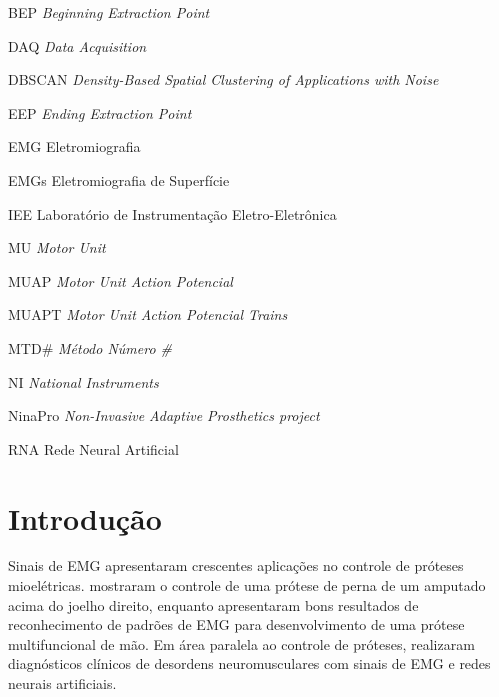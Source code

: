 
\listoffigures*
\cleardoublepage

\listoftables*
\cleardoublepage

\begin{siglas}
	\item[BEP]		\emph{Beginning Extraction Point}
	\item[DAQ]		\emph{Data Acquisition}
	\item[DBSCAN]	\emph{Density-Based Spatial Clustering of Applications with Noise}
	\item[EEP]		\emph{Ending Extraction Point}
  	\item[EMG]		Eletromiografia
	\item[EMGs]		Eletromiografia de Superfície
	\item[IEE]		Laboratório de Instrumentação Eletro-Eletrônica
	\item[MU]		\emph{Motor Unit}
  	\item[MUAP]		\emph{Motor Unit Action Potencial}
	\item[MUAPT]	\emph{Motor Unit Action Potencial Trains}
	\item[MTD\#]	\emph{Método Número \#}
	\item[NI]		\emph{National Instruments}
	\item[NinaPro]	\emph{Non-Invasive Adaptive Prosthetics project}
	\item[RNA]		Rede Neural Artificial
\end{siglas}

\tableofcontents*
\cleardoublepage

\textual
	\chapter{Introdução}
Sinais de EMG apresentaram crescentes aplicações no controle de próteses mioelétricas.  mostraram o controle de uma prótese de perna de um amputado acima do joelho direito, enquanto  apresentaram bons resultados de reconhecimento de padrões de EMG para desenvolvimento de uma prótese multifuncional de mão. Em área paralela ao controle de próteses,  realizaram diagnósticos clínicos de desordens neuromusculares com sinais de EMG e redes neurais artificiais.

